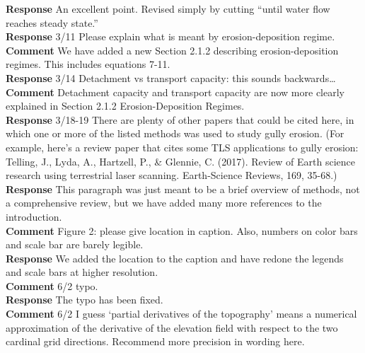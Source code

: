 \documentclass[gmd, manuscript]{copernicus}
\begin{document}
\noindent\textbf{Response}
An excellent point. Revised simply by cutting ``until water flow reaches steady state.''
\\

\noindent\textbf{Response}
3/11 Please explain what is meant by erosion-deposition regime.
\\

\noindent\textbf{Comment}
We have added a new Section 2.1.2 describing erosion-deposition regimes. This includes equations 7-11. 
\\

\noindent\textbf{Response}
3/14 Detachment vs transport capacity: this sounds backwards\ldots
\\

\noindent\textbf{Comment}
Detachment capacity and transport capacity are now more clearly explained in Section 2.1.2 Erosion-Deposition Regimes. 
\\

\noindent\textbf{Response}
3/18-19 There are plenty of other papers that could be cited here, in which one or more of the listed methods was used to study gully erosion. (For example, here's a review paper that cites some TLS applications to gully erosion: \\
Telling, J., Lyda, A., Hartzell, P., \& Glennie, C. (2017). Review of Earth science research using terrestrial laser scanning. Earth-Science Reviews, 169, 35-68.)
\\

\noindent\textbf{Response}
This paragraph was just meant to be a brief overview of methods, not a comprehensive review, but we have added many more references to the introduction.\\

\noindent\textbf{Comment}
Figure 2: please give location in caption. Also, numbers on color bars and scale bar are barely legible.
\\

\noindent\textbf{Response}
We added the location to the caption and have redone the legends and scale bars at higher resolution.
\\

\noindent\textbf{Comment}
6/2 typo.
\\

\noindent\textbf{Response}
The typo has been fixed. 
\\

\noindent\textbf{Comment}
6/2 I guess `partial derivatives of the topography' means a numerical approximation of the derivative of the elevation field with respect to the two cardinal grid directions. Recommend more precision in wording here.\\
\end{document}
